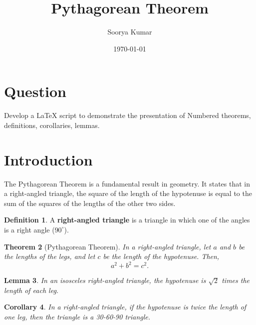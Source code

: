 \documentclass{article}
\title{Pythagorean Theorem}
\author{Soorya Kumar}
\date{\today}
\theoremstyle{plain}
\newtheorem{theorem}{Theorem}[section]
\newtheorem{lemma}[theorem]{Lemma}
\newtheorem{corollary}[theorem]{Corollary}
\theoremstyle{definition}
\newtheorem{definition}[theorem]{Definition}
\begin{document}
	\maketitle
	\large{
		\section*{Question}
			 {\Large Develop a LaTeX script to demonstrate the presentation of Numbered theorems, definitions, corollaries, lemmas.}
		\section{Introduction}
			The Pythagorean Theorem is a fundamental result in geometry. It states that in a right-angled triangle, the square of the length of the hypotenuse is equal to the sum of the squares of the lengths of the other two sides.
		
		\begin{definition}
			A \textbf{right-angled triangle} is a triangle in which one of the angles is a right angle (\(90^\circ\)).
		\end{definition}
		
		\begin{theorem}[Pythagorean Theorem] 
			In a right-angled triangle, let \( a \) and \( b \) be the lengths of the legs, and let \( c \) be the length of the hypotenuse. Then,
			\[
			a^2 + b^2 = c^2.
			\]
		\end{theorem}
		
		\begin{lemma}
			In an isosceles right-angled triangle, the hypotenuse is \( \sqrt{2} \) times the length of each leg.
		\end{lemma}
		
		\begin{corollary}
			In a right-angled triangle, if the hypotenuse is twice the length of one leg, then the triangle is a 30-60-90 triangle.
		\end{corollary}
	}
\end{document}
